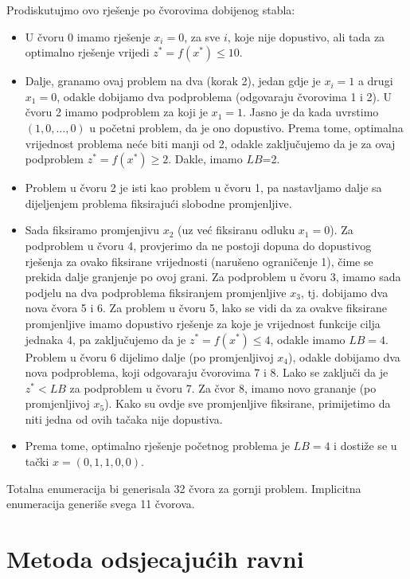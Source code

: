 \documentclass[b5paper, utf8, 11pt, colorlinks]{book}
\theoremstyle{definition}
\begin{document}
Prodiskutujmo ovo rješenje po čvorovima dobijenog stabla:
  \begin{itemize}
      \item U čvoru 0 imamo  rješenje $x_i = 0$, za sve $i$, koje  nije dopustivo, ali  tada za optimalno rješenje vrijedi $z^*=f(x^*) \leq 10$.
      \item  Dalje, granamo ovaj problem na dva (korak 2), jedan gdje je $x_i=1$ a drugi $x_1=0$, odakle dobijamo dva podproblema (odgovaraju čvorovima 1 i 2). U čvoru 2 imamo podproblem za koji je $x_1=1$. Jasno je da kada uvrstimo $(1,0, \ldots, 0)$ u početni problem, da je ono dopustivo. Prema tome, optimalna vrijednost problema neće biti manji od 2, odakle zaključujemo da je za ovaj podproblem $z^*=f(x^*) \geq 2$. Dakle, imamo $LB$=2. 
      \item Problem u čvoru 2 je isti kao problem u čvoru 1, pa nastavljamo dalje sa dijeljenjem problema fiksirajući slobodne promjenljive. 
      \item Sada fiksiramo promjenjivu $x_2$ (uz već fiksiranu odluku $x_1=0$). 
            Za podproblem u čvoru 4, provjerimo da ne postoji dopuna do dopustivog rješenja za ovako fiksirane vrijednosti (narušeno ograničenje 1), čime se prekida dalje granjenje po ovoj grani. Za podproblem u čvoru 3, imamo sada podjelu na dva podproblema fiksiranjem promjenljive $x_3$, tj. dobijamo dva   nova čvora 5 i 6. Za problem u čvoru 5, lako se vidi da za ovakve fiksirane promjenljive imamo dopustivo rješenje za koje je vrijednost funkcije cilja jednaka 4, pa zaključujemo da je $z^*=f(x^*) \leq 4$, odakle imamo $LB=4$. Problem u čvoru 6 dijelimo dalje (po promjenljivoj $x_4$), odakle dobijamo dva nova podproblema, koji odgovaraju čvorovima 7 i 8. Lako se zaključi da je $z^*<LB$ za   podproblem u čvoru 7.  Za čvor 8, imamo novo grananje (po promjenljivoj $x_5$). Kako su ovdje sve promjenljive fiksirane, primijetimo da niti jedna od ovih tačaka  nije dopustiva.
            \item Prema tome, optimalno rješenje početnog problema je $LB=4$ i dostiže se u tački $x=(0, 1, 1, 0, 0)$. 
  \end{itemize}
  Totalna enumeracija bi generisala 32 čvora za gornji problem. Implicitna enumeracija generiše svega 11 čvorova. 
 
\section{Metoda odsjecajućih ravni}
  
\end{document}
